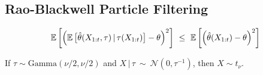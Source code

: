 \subsection{Rao-Blackwell Particle Filtering}

\begin{theorem}
\begin{equation*}
\operatorname{\mathbb{E}} \left[ \left( \operatorname{\mathbb{E}} \big[\hat{\theta}(X_{1:t}, \tau) \,|\, \tau(X_{1:t}) \big] - \theta \right)^2 \right] ~ \leq ~ \operatorname{\mathbb{E}} \left[ \left( \hat{\theta}(X_{1:t}) - \theta \right)^2 \right]
\end{equation*}
\end{theorem}

\begin{lemma}
If $\tau \sim \textrm{Gamma}(\nu/2, \nu/2)$ and $X \,|\, \tau ~ \sim ~ \mathcal{N}(0, \tau^{-1})$, then $X \sim t_\nu$.
\end{lemma}


